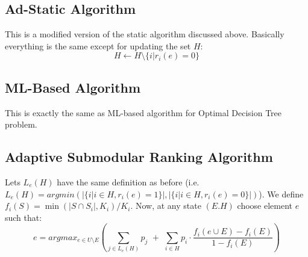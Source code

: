 \documentclass[12pt,epsfig,graphicx,amsmath,color]{article}
\begin{document}
\subsection{Ad-Static Algorithm}
This is a modified version of the static algorithm discussed above. Basically everything is the same except for updating the set $H$:
$$H\leftarrow H \setminus \{i|r_i(e)=0\}$$

\subsection{ML-Based Algorithm}
This is exactly the same as ML-based algorithm for Optimal Decision Tree problem.

\subsection{Adaptive Submodular Ranking Algorithm}
Lets $L_e(H)$ have the same definition as before (i.e. $L_e(H) = argmin(|\{i|i\in H, r_i(e)=1\}|,|\{i|i\in H, r_i(e)=0\}|)$). We define $f_i(S) = \min(|S\cap S_i|,K_i)/K_i$. Now, at any state $(E.H)$ choose element $e$ such that:
$$e = argmax_{e\in U\setminus E}\left( \sum_{j\in L_e(H)} p_j \,\,+\,\, \sum\limits_{i\in H} p_i \cdot \frac{f_i(e\cup E)-f_i(E)}{1-f_i(E)} \right)$$





\end{document}
